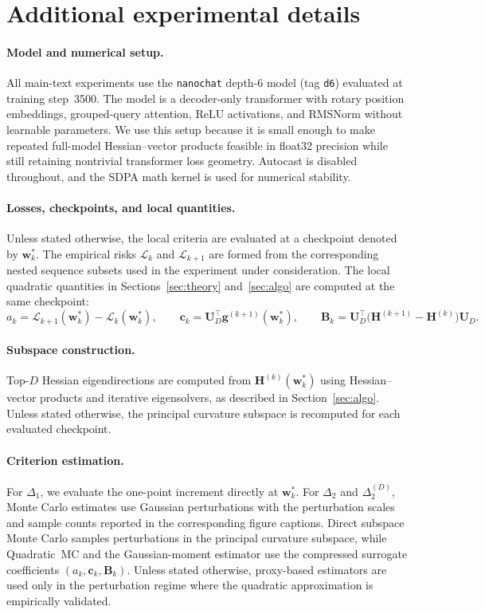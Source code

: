 \documentclass{article}
\begin{document}
\section{Additional experimental details}
\label{app:exp}

\paragraph{Model and numerical setup.}
All main-text experiments use the \texttt{nanochat} depth-6 model (tag \texttt{d6}) evaluated at training step~3500. The model is a decoder-only transformer with rotary position embeddings, grouped-query attention, $\mathrm{ReLU}$ activations, and RMSNorm without learnable parameters. We use this setup because it is small enough to make repeated full-model Hessian--vector products feasible in float32 precision while still retaining nontrivial transformer loss geometry. Autocast is disabled throughout, and the SDPA math kernel is used for numerical stability.

\paragraph{Losses, checkpoints, and local quantities.}
Unless stated otherwise, the local criteria are evaluated at a checkpoint denoted by $\mathbf w_k^*$. The empirical risks $\mathcal L_k$ and $\mathcal L_{k+1}$ are formed from the corresponding nested sequence subsets used in the experiment under consideration. The local quadratic quantities in Sections~\ref{sec:theory} and~\ref{sec:algo} are computed at the same checkpoint:
\[
a_k = \mathcal L_{k+1}(\mathbf w_k^*)-\mathcal L_k(\mathbf w_k^*),\qquad
\mathbf c_k = \mathbf U_D^\top \mathbf g^{(k+1)}(\mathbf w_k^*),\qquad
\mathbf B_k=\mathbf U_D^\top\bigl(\mathbf H^{(k+1)}-\mathbf H^{(k)}\bigr)\mathbf U_D.
\]

\paragraph{Subspace construction.}
Top-$D$ Hessian eigendirections are computed from $\mathbf H^{(k)}(\mathbf w_k^*)$ using Hessian--vector products and iterative eigensolvers, as described in Section~\ref{sec:algo}. Unless stated otherwise, the principal curvature subspace is recomputed for each evaluated checkpoint.

\paragraph{Criterion estimation.}
For $\Delta_1$, we evaluate the one-point increment directly at $\mathbf w_k^*$. For $\Delta_2$ and $\Delta_2^{(D)}$, Monte Carlo estimates use Gaussian perturbations with the perturbation scales and sample counts reported in the corresponding figure captions. Direct subspace Monte Carlo samples perturbations in the principal curvature subspace, while Quadratic~MC and the Gaussian-moment estimator use the compressed surrogate coefficients $(a_k,\mathbf c_k,\mathbf B_k)$. Unless stated otherwise, proxy-based estimators are used only in the perturbation regime where the quadratic approximation is empirically validated.
\end{document}
